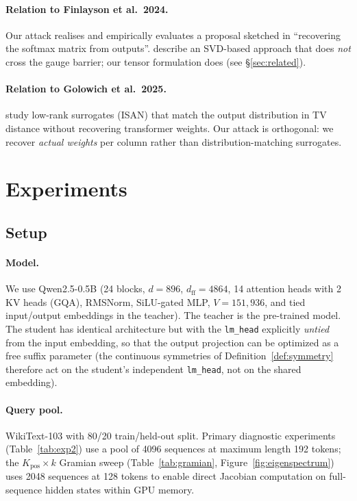 \documentclass{article}
\begin{document}
\paragraph{Relation to Finlayson et al.\ 2024.} Our attack realises and empirically evaluates a proposal sketched in \citet[\S7.3]{finlayson2024logits} ``recovering the softmax matrix from outputs''. \citeauthor{finlayson2024logits} describe an SVD-based approach that does \emph{not} cross the gauge barrier; our tensor formulation does (see \S\ref{sec:related}).

\paragraph{Relation to Golowich et al.\ 2025.} \citet{golowich2025sequences, golowich2025provably} study low-rank surrogates (ISAN) that match the output distribution in TV distance without recovering transformer weights. Our attack is orthogonal: we recover \emph{actual weights} per column rather than distribution-matching surrogates.

\section{Experiments}
\label{sec:experiments}

\subsection{Setup}
\label{sec:exp-setup}

\paragraph{Model.} We use Qwen2.5-0.5B (24 blocks, $d=896$, $d_\text{ff}=4864$, 14 attention heads with 2 KV heads (GQA), RMSNorm, SiLU-gated MLP, $V=151{,}936$, and tied input/output embeddings in the teacher). The teacher is the pre-trained model. The student has identical architecture but with the \texttt{lm\_head} explicitly \emph{untied} from the input embedding, so that the output projection can be optimized as a free suffix parameter (the continuous symmetries of Definition~\ref{def:symmetry} therefore act on the student's independent \texttt{lm\_head}, not on the shared embedding).

\paragraph{Query pool.} WikiText-103 \citep{merity2016pointer} with 80/20 train/held-out split. Primary diagnostic experiments (Table~\ref{tab:exp2}) use a pool of 4096 sequences at maximum length 192 tokens; the $K_{\text{pos}}\times k$ Gramian sweep (Table~\ref{tab:gramian}, Figure~\ref{fig:eigenspectrum}) uses 2048 sequences at 128 tokens to enable direct Jacobian computation on full-sequence hidden states within GPU memory.
\end{document}
